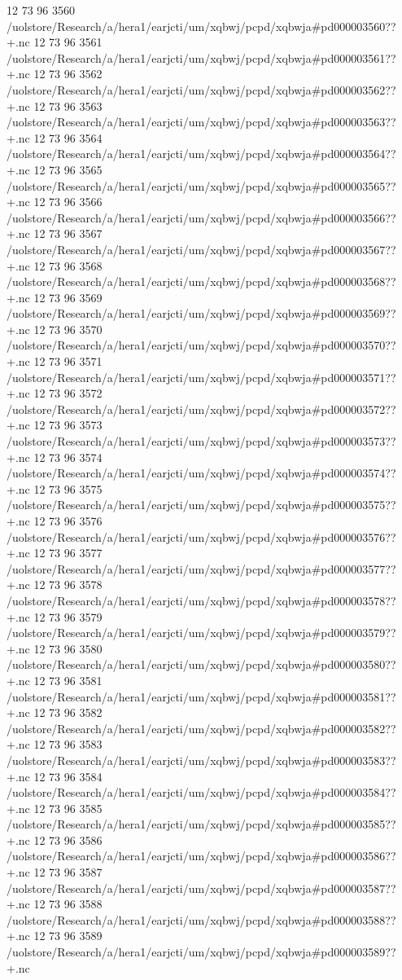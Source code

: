12 73 96
3560
/uolstore/Research/a/hera1/earjcti/um/xqbwj/pcpd/xqbwja#pd000003560??+.nc
12 73 96
3561
/uolstore/Research/a/hera1/earjcti/um/xqbwj/pcpd/xqbwja#pd000003561??+.nc
12 73 96
3562
/uolstore/Research/a/hera1/earjcti/um/xqbwj/pcpd/xqbwja#pd000003562??+.nc
12 73 96
3563
/uolstore/Research/a/hera1/earjcti/um/xqbwj/pcpd/xqbwja#pd000003563??+.nc
12 73 96
3564
/uolstore/Research/a/hera1/earjcti/um/xqbwj/pcpd/xqbwja#pd000003564??+.nc
12 73 96
3565
/uolstore/Research/a/hera1/earjcti/um/xqbwj/pcpd/xqbwja#pd000003565??+.nc
12 73 96
3566
/uolstore/Research/a/hera1/earjcti/um/xqbwj/pcpd/xqbwja#pd000003566??+.nc
12 73 96
3567
/uolstore/Research/a/hera1/earjcti/um/xqbwj/pcpd/xqbwja#pd000003567??+.nc
12 73 96
3568
/uolstore/Research/a/hera1/earjcti/um/xqbwj/pcpd/xqbwja#pd000003568??+.nc
12 73 96
3569
/uolstore/Research/a/hera1/earjcti/um/xqbwj/pcpd/xqbwja#pd000003569??+.nc
12 73 96
3570
/uolstore/Research/a/hera1/earjcti/um/xqbwj/pcpd/xqbwja#pd000003570??+.nc
12 73 96
3571
/uolstore/Research/a/hera1/earjcti/um/xqbwj/pcpd/xqbwja#pd000003571??+.nc
12 73 96
3572
/uolstore/Research/a/hera1/earjcti/um/xqbwj/pcpd/xqbwja#pd000003572??+.nc
12 73 96
3573
/uolstore/Research/a/hera1/earjcti/um/xqbwj/pcpd/xqbwja#pd000003573??+.nc
12 73 96
3574
/uolstore/Research/a/hera1/earjcti/um/xqbwj/pcpd/xqbwja#pd000003574??+.nc
12 73 96
3575
/uolstore/Research/a/hera1/earjcti/um/xqbwj/pcpd/xqbwja#pd000003575??+.nc
12 73 96
3576
/uolstore/Research/a/hera1/earjcti/um/xqbwj/pcpd/xqbwja#pd000003576??+.nc
12 73 96
3577
/uolstore/Research/a/hera1/earjcti/um/xqbwj/pcpd/xqbwja#pd000003577??+.nc
12 73 96
3578
/uolstore/Research/a/hera1/earjcti/um/xqbwj/pcpd/xqbwja#pd000003578??+.nc
12 73 96
3579
/uolstore/Research/a/hera1/earjcti/um/xqbwj/pcpd/xqbwja#pd000003579??+.nc
12 73 96
3580
/uolstore/Research/a/hera1/earjcti/um/xqbwj/pcpd/xqbwja#pd000003580??+.nc
12 73 96
3581
/uolstore/Research/a/hera1/earjcti/um/xqbwj/pcpd/xqbwja#pd000003581??+.nc
12 73 96
3582
/uolstore/Research/a/hera1/earjcti/um/xqbwj/pcpd/xqbwja#pd000003582??+.nc
12 73 96
3583
/uolstore/Research/a/hera1/earjcti/um/xqbwj/pcpd/xqbwja#pd000003583??+.nc
12 73 96
3584
/uolstore/Research/a/hera1/earjcti/um/xqbwj/pcpd/xqbwja#pd000003584??+.nc
12 73 96
3585
/uolstore/Research/a/hera1/earjcti/um/xqbwj/pcpd/xqbwja#pd000003585??+.nc
12 73 96
3586
/uolstore/Research/a/hera1/earjcti/um/xqbwj/pcpd/xqbwja#pd000003586??+.nc
12 73 96
3587
/uolstore/Research/a/hera1/earjcti/um/xqbwj/pcpd/xqbwja#pd000003587??+.nc
12 73 96
3588
/uolstore/Research/a/hera1/earjcti/um/xqbwj/pcpd/xqbwja#pd000003588??+.nc
12 73 96
3589
/uolstore/Research/a/hera1/earjcti/um/xqbwj/pcpd/xqbwja#pd000003589??+.nc
